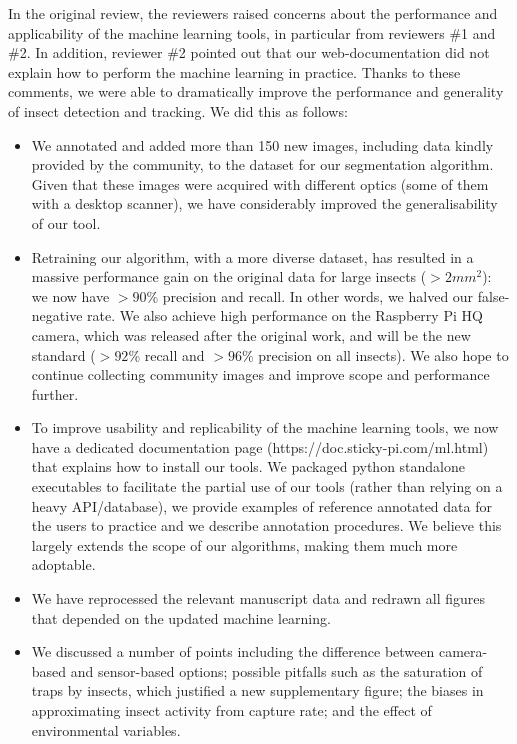 \documentclass[12pt,a4paper,roman]{moderncv}
\begin{document}
In the original review, the reviewers raised concerns about the performance and applicability of the machine learning tools, in particular from reviewers \#1 and \#2. In addition, reviewer \#2 pointed out that our web-documentation did not explain how to perform the machine learning in practice. 
Thanks to these comments, we were able to dramatically improve the performance and generality of insect detection and tracking. We did this as follows:
\begin{itemize}
	
\item{} We annotated and added more than 150 new images, including data kindly provided by the community, to the dataset for our segmentation algorithm. Given that these images were acquired with different optics (some of them with a desktop scanner), we have considerably improved the generalisability of our tool. 

\item{} Retraining our algorithm, with a more diverse dataset, has resulted in a massive performance gain on the original data for large insects ($>2mm^2$): we now have $>90$\% precision and recall. In other words, we halved our false-negative rate. We also achieve high performance on the Raspberry Pi HQ camera, which was released after the original work, and will be the new standard ($>92$\% recall and $>96$\% precision on all insects). We also hope to continue collecting community images and improve scope and performance further. 

\item{} To improve usability and replicability of the machine learning tools, we now have a dedicated documentation page (https://doc.sticky-pi.com/ml.html) that explains how to install our tools. We packaged python standalone executables to facilitate the partial use of our tools (rather than relying on a heavy API/database), we provide examples of reference annotated data for the users to practice and we describe annotation procedures. We believe this largely extends the scope of our algorithms, making them much more adoptable. 

\item{} We have reprocessed the relevant manuscript data and redrawn all figures that depended on the updated machine learning.

\item{} We discussed a number of points including the difference between camera-based and sensor-based options; possible pitfalls such as the saturation of traps by insects, which justified a new supplementary figure; the biases in approximating insect activity from capture rate; and the effect of environmental variables.

\end{itemize}


\makeletterclosing
\end{document}
